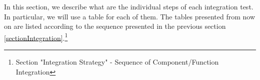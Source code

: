 In this section, we describe what are the individual steps of each integration test. In particular, we will use a table for each of them. \newline
The tables presented from now on are listed according to the sequence presented in the previous section \ref{sectionIntegration}.\footnote{Section "Integration Strategy" - Sequence of Component/Function Integration}



